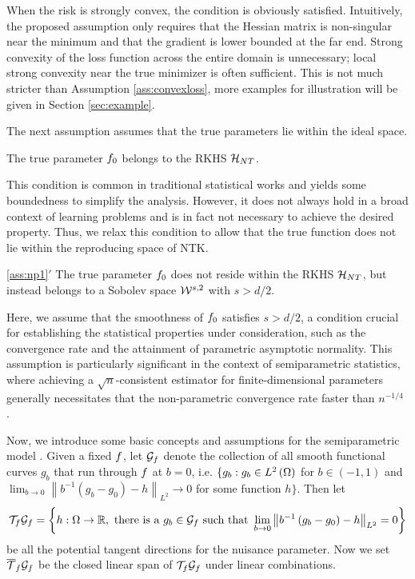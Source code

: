 When the risk is strongly convex, the condition is obviously satisfied. 
Intuitively, the proposed assumption only requires that the Hessian matrix is non-singular near the minimum and that the gradient is lower bounded at the far end. 
Strong convexity of the loss function across the entire domain is unnecessary; local strong convexity near the true minimizer is often sufficient. This is not much stricter than Assumption \ref{ass:convexloss}, more examples for illustration will be given in Section \ref{sec:example}. 


The next assumption assumes that the true parameters lie within the ideal space. 
\begin{assumption} \label{ass:np1} 
The true parameter $f_{0}$ belongs to the RKHS $\mathcal{H}_{NT}$. 
\end{assumption}

This condition is common in traditional statistical works and yields some boundedness to simplify the analysis. However, it does not always hold in a broad context of learning problems and is in fact not necessary to achieve the desired property. Thus, we relax this condition to allow that the true function does not lie within the reproducing space of NTK.

\begin{manualtheorem}{\ref*{ass:np1}$'$}\label{ass:np2} 
The true parameter \(f_{0}\) does not reside within the RKHS \(\mathcal{H}_{NT}\), but instead belongs to a Sobolev space \(\mathcal{W}^{s,2}\) with \(s > d/2\).
\end{manualtheorem}



Here, we assume that the smoothness of \(f_{0}\) satisfies \(s > d/2\), a condition crucial for establishing the statistical properties under consideration, such as the convergence rate and the attainment of parametric asymptotic normality. This assumption is particularly significant in the context of semiparametric statistics, where achieving a \(\sqrt{n}\)-consistent estimator for finite-dimensional parameters generally necessitates that the non-parametric convergence rate faster than \(n^{-1/4}\) \citep{van2000asymptotic,kosorok2008introduction}. 



Now, we introduce some basic concepts and assumptions for the semiparametric model \citep{van2000asymptotic,kosorok2008introduction}.
Given a fixed $f$, 
let $\mathcal{G}_{f}$ denote the collection of all smooth functional curves $g_b$ that run through $f$ at $b=0$, i.e. 
$\{g_b: g_b \in L^2\left( \Omega \right)$ for $ b \in(-1,1)$ and 
$\lim _{b \rightarrow 0}\left\|b^{-1}\left(g_b-g_0\right)-h\right\|_{L^2} \rightarrow 0$ for some function $h \}$. 
Then let 
$$\mathcal{T}_{f}\mathcal{G}_{f} =\left\{h: \Omega \to \mathbb{R}, \text{ there is a }  g_b \in \mathcal{G}_{f } \text{ such that } \lim _{b \rightarrow 0}\left\|b^{-1}\left(g_b-g_0\right)-h\right\|_{L^2}=0\right\}$$
be all the potential tangent directions for the nuisance parameter. 
Now we set $\overline{\mathcal{T}}_{f }\mathcal{G}_{f}$ be the closed linear span of $\mathcal{T}_{f }\mathcal{G}_{f}$ under linear combinations. 



